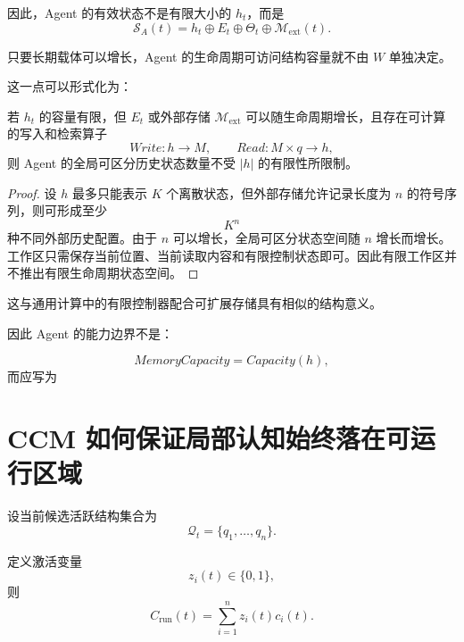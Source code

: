 因此，Agent 的有效状态不是有限大小的 $h_t$，而是
\[
\boxed{
\mathcal S_A(t)
=
h_t
\oplus
E_t
\oplus
\Theta_t
\oplus
\mathcal M_{\mathrm{ext}}(t).
}
\]

只要长期载体可以增长，Agent 的生命周期可访问结构容量就不由 $W$ 单独决定。

这一点可以形式化为：

\begin{lemma}
若 $h_t$ 的容量有限，但 $E_t$ 或外部存储 $\mathcal M_{\mathrm{ext}}$ 可以随生命周期增长，且存在可计算的写入和检索算子
\begin{equation}
Write:
h\rightarrow M,
\qquad
Read:
M\times q\rightarrow h,
\end{equation}
则 Agent 的全局可区分历史状态数量不受 $|h|$ 的有限性所限制。
\end{lemma}

\begin{proof}
设 $h$ 最多只能表示 $K$ 个离散状态，但外部存储允许记录长度为 $n$ 的符号序列，则可形成至少
\begin{equation}
K^n
\end{equation}
种不同外部历史配置。由于 $n$ 可以增长，全局可区分状态空间随 $n$ 增长而增长。工作区只需保存当前位置、当前读取内容和有限控制状态即可。因此有限工作区并不推出有限生命周期状态空间。
\end{proof}

这与通用计算中的有限控制器配合可扩展存储具有相似的结构意义。

因此 Agent 的能力边界不是：

\begin{equation}
MemoryCapacity=Capacity(h),
\end{equation}
而应写为
\begin{statementbox}
\centering
{}
\end{statementbox}

\section{CCM 如何保证局部认知始终落在可运行区域}

设当前候选活跃结构集合为
\begin{equation}
\mathcal Q_t
=
\{q_1,\ldots,q_n\}.
\end{equation}

定义激活变量
\begin{equation}
z_i(t)\in\{0,1\},
\end{equation}
则
\begin{equation}
C_{\mathrm{run}}(t)
=
\sum_{i=1}^{n}
z_i(t)c_i(t).
\end{equation}

